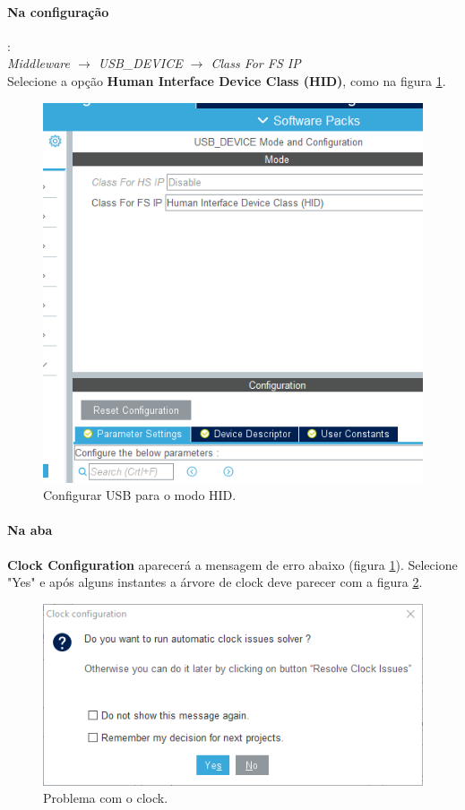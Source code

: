 \documentclass[a4paper,twocolumn,twoside,11pt]{article}
\begin{document}
\paragraph{Na configuração}:\\ \textit{Middleware $\rightarrow$ USB\_DEVICE $\rightarrow$ Class For FS IP}\\ Selecione a opção \textbf{Human Interface Device Class (HID)}, como na figura \ref{fig:ex3}.

\begin{figure}[H]
  \centering
  \includegraphics[width=0.8\linewidth]{3_cube_USB_ClassFS.png}
  \caption{Configurar USB para o modo HID.}
  \label{fig:ex3}
\end{figure}

\paragraph{Na aba} \textbf{Clock Configuration} aparecerá a mensagem de erro abaixo (figura \ref{fig:ex3}). Selecione "Yes" e após alguns instantes a árvore de clock deve parecer com a figura \ref{fig:ex4}.

\begin{figure}[h]
  \includegraphics[width=0.8\linewidth]{4_cube_clock_problem.png}
  \caption{Problema com o clock.}
  \label{fig:ex4}
\end{figure}
\end{document}
